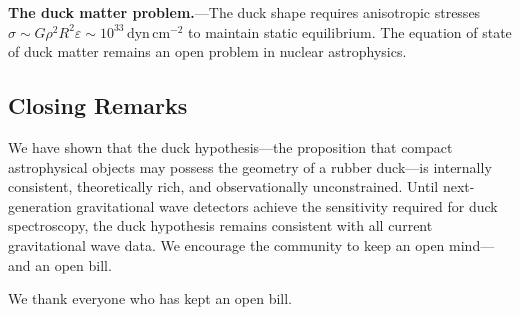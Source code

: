 \documentclass[aps,prd,twocolumn,superscriptaddress,nofootinbib]{revtex4-2}
\begin{document}
\textbf{The duck matter problem.}---The duck shape requires anisotropic
stresses $\sigma \sim G \rho^2 R^2 \varepsilon \sim
10^{33}\,\mathrm{dyn\,cm^{-2}}$ to maintain static equilibrium.
The equation of state of duck matter remains an open problem in nuclear
astrophysics.


\subsection{Closing Remarks}

We have shown that the duck hypothesis---the proposition that compact
astrophysical objects may possess the geometry of a rubber duck---is
internally consistent, theoretically rich, and observationally
unconstrained.
Until next-generation gravitational wave detectors achieve the sensitivity
required for duck spectroscopy, the duck hypothesis remains consistent with
all current gravitational wave data.
We encourage the community to keep an open mind---and an open bill.


\begin{acknowledgments}
We thank everyone who has kept an open bill.
\end{acknowledgments}


\end{document}
